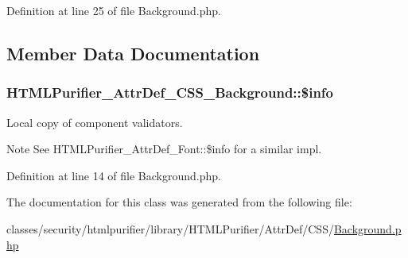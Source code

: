 Definition at line 25 of file Background.\+php.



\subsection{Member Data Documentation}
\hypertarget{classHTMLPurifier__AttrDef__CSS__Background_a7d0f96826ddc1cc7fcd9e7dd605fd6c8}{
\subsubsection[{\$info}]{\setlength{\rightskip}{0pt plus 5cm}H\+T\+M\+L\+Purifier\+\_\+\+Attr\+Def\+\_\+\+C\+S\+S\+\_\+\+Background\+::\$info\hspace{0.3cm}{\ttfamily [protected]}}}\label{classHTMLPurifier__AttrDef__CSS__Background_a7d0f96826ddc1cc7fcd9e7dd605fd6c8}
Local copy of component validators. \begin{DoxyNote}{Note}
See H\+T\+M\+L\+Purifier\+\_\+\+Attr\+Def\+\_\+\+Font\+::\$info for a similar impl. 
\end{DoxyNote}


Definition at line 14 of file Background.\+php.



The documentation for this class was generated from the following file\+:\begin{DoxyCompactItemize}
\item 
classes/security/htmlpurifier/library/\+H\+T\+M\+L\+Purifier/\+Attr\+Def/\+C\+S\+S/\hyperlink{AttrDef_2CSS_2Background_8php}{Background.\+php}\end{DoxyCompactItemize}
